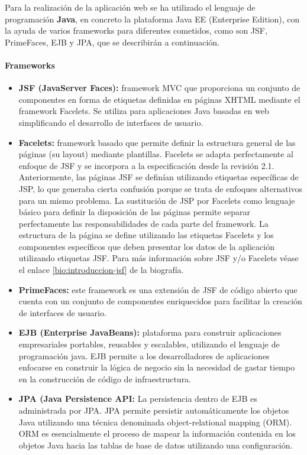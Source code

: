 Para la realización de la aplicación web se ha utilizado el lenguaje de programación \textbf{Java}, en concreto la plataforma Java EE (Enterprise Edition), con la ayuda de varios frameworks para diferentes cometidos, como son JSF, PrimeFaces, EJB y JPA, que se describirán a continuación.

\paragraph*{Frameworks}

\begin{itemize}
\item \textbf{JSF (JavaServer Faces):} framework MVC que proporciona un conjunto de componentes en forma de etiquetas definidas en páginas XHTML mediante el framework Facelets. Se utiliza para aplicaciones Java basadas en web simplificando el desarrollo de interfaces de usuario. 
\item \textbf{Facelets:} framework basado que permite definir la estructura general de las páginas (su layout) mediante plantillas. Facelets se adapta perfectamente al enfoque de JSF y se incorpora a la especificación desde la revisión 2.1. Anteriormente, las páginas JSF se definían utilizando etiquetas específicas de JSP, lo que generaba cierta confusión porque se trata de enfoques alternativos para un mismo problema. La sustitución de JSP por Facelets como lenguaje básico para definir la disposición de las páginas permite separar perfectamente las responsabilidades de cada parte del framework. La estructura de la página se define utilizando las etiquetas Facelets y los componentes específicos que deben presentar los datos de la aplicación utilizando etiquetas JSF. Para más información sobre JSF y/o Facelets véase el enlace \ref{bio:introduccion-jsf} de la biografía.
\item \textbf{PrimeFaces:} este framework es una extensión de JSF de código abierto que cuenta con un conjunto de componentes enriquecidos para facilitar la creación de interfaces de usuario.
\item \textbf{EJB (Enterprise JavaBeans):} plataforma para construir aplicaciones empresariales portables, reusables y escalables, utilizando el lenguaje de programación java. EJB permite a los desarrolladores de aplicaciones enfocarse en construir la lógica de negocio sin la necesidad de gastar tiempo en la construcción de código de infraestructura. 
\item \textbf{JPA (Java Persistence API:} La persistencia dentro de EJB es administrada por JPA. JPA permite persistir automáticamente los objetos Java utilizando una técnica denominada object-relational mapping (ORM). ORM es esencialmente el proceso de mapear la información contenida en los objetos Java hacia las tablas de base de datos utilizando una configuración.

\end{itemize}
